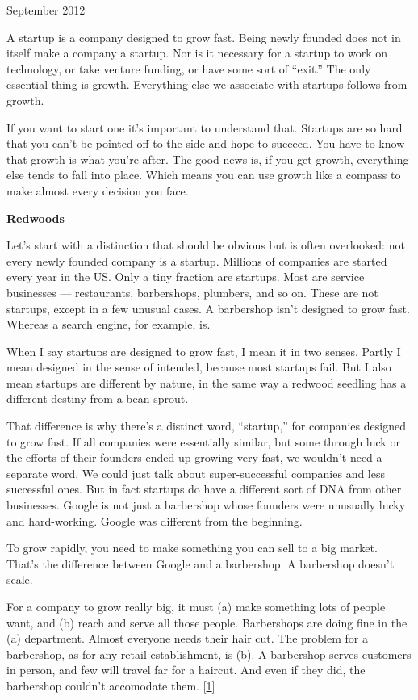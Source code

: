 September 2012

A startup is a company designed to grow fast. Being newly founded does
not in itself make a company a startup. Nor is it necessary for a
startup to work on technology, or take venture funding, or have some
sort of ``exit.'' The only essential thing is growth. Everything else we
associate with startups follows from growth.

If you want to start one it's important to understand that. Startups are
so hard that you can't be pointed off to the side and hope to succeed.
You have to know that growth is what you're after. The good news is, if
you get growth, everything else tends to fall into place. Which means
you can use growth like a compass to make almost every decision you
face.

\textbf{Redwoods}

Let's start with a distinction that should be obvious but is often
overlooked: not every newly founded company is a startup. Millions of
companies are started every year in the US. Only a tiny fraction are
startups. Most are service businesses --- restaurants, barbershops,
plumbers, and so on. These are not startups, except in a few unusual
cases. A barbershop isn't designed to grow fast. Whereas a search
engine, for example, is.

When I say startups are designed to grow fast, I mean it in two senses.
Partly I mean designed in the sense of intended, because most startups
fail. But I also mean startups are different by nature, in the same way
a redwood seedling has a different destiny from a bean sprout.

That difference is why there's a distinct word, ``startup,'' for
companies designed to grow fast. If all companies were essentially
similar, but some through luck or the efforts of their founders ended up
growing very fast, we wouldn't need a separate word. We could just talk
about super-successful companies and less successful ones. But in fact
startups do have a different sort of DNA from other businesses. Google
is not just a barbershop whose founders were unusually lucky and
hard-working. Google was different from the beginning.

To grow rapidly, you need to make something you can sell to a big
market. That's the difference between Google and a barbershop. A
barbershop doesn't scale.

For a company to grow really big, it must (a) make something lots of
people want, and (b) reach and serve all those people. Barbershops are
doing fine in the (a) department. Almost everyone needs their hair cut.
The problem for a barbershop, as for any retail establishment, is (b). A
barbershop serves customers in person, and few will travel far for a
haircut. And even if they did, the barbershop couldn't accomodate them.
{[}\hyperref[f1n]{1}{]}

